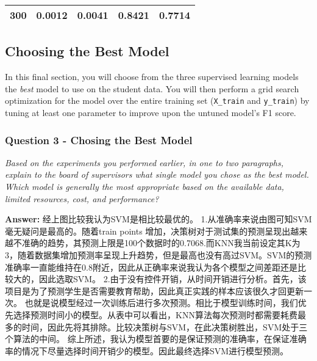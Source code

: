 \documentclass{ctexart}
\begin{document}
\begin{longtable}[]{@{}ccccc@{}}
\begin{minipage}[t]{0.16\columnwidth}\centering\strut
300\strut
\end{minipage} & \begin{minipage}[t]{0.21\columnwidth}\centering\strut
0.0012\strut
\end{minipage} & \begin{minipage}[t]{0.20\columnwidth}\centering\strut
0.0041\strut
\end{minipage} & \begin{minipage}[t]{0.15\columnwidth}\centering\strut
0.8421\strut
\end{minipage} & \begin{minipage}[t]{0.14\columnwidth}\centering\strut
0.7714\strut
\end{minipage}\tabularnewline
\bottomrule
\end{longtable}

    \subsection{Choosing the Best Model}\label{choosing-the-best-model}

In this final section, you will choose from the three supervised
learning models the \emph{best} model to use on the student data. You
will then perform a grid search optimization for the model over the
entire training set (\texttt{X\_train} and \texttt{y\_train}) by tuning
at least one parameter to improve upon the untuned model's F1 score.

    \subsubsection{Question 3 - Chosing the Best
Model}\label{question-3---chosing-the-best-model}

\emph{Based on the experiments you performed earlier, in one to two
paragraphs, explain to the board of supervisors what single model you
chose as the best model. Which model is generally the most appropriate
based on the available data, limited resources, cost, and performance?}

    \textbf{Answer: } 经上图比较我认为SVM是相比较最优的。
1.从准确率来说由图可知SVM毫无疑问是最高的。随着train points
增加，决策树对于测试集的预测呈现出越来越不准确的趋势，其预测上限是100个数据时的0.7068.而KNN我当前设定其K为3，随着数据集增加预测率呈现上升趋势，但是最高也没有高过SVM。SVM的预测准确率一直能维持在0.8附近，因此从正确率来说我认为各个模型之间差距还是比较大的，因此选取SVM。
2.由于没有控件开销，从时间开销进行分析。首先，该项目是为了预测学生是否需要教育帮助，因此真正实践的样本应该很久才回更新一次。
也就是说模型经过一次训练后进行多次预测。相比于模型训练时间，我们优先选择预测时间小的模型。从表中可以看出，KNN算法每次预测时都需要耗费最多的时间，因此先将其排除。比较决策树与SVM，在此决策树胜出，SVM处于三个算法的中间。
综上所述，我认为模型首要的是保证预测的准确率，在保证准确率的情况下尽量选择时间开销少的模型。因此最终选择SVM进行模型预测。
\end{document}
